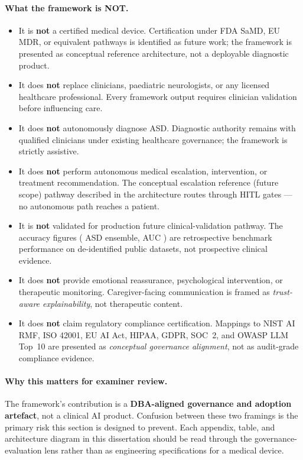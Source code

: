 \paragraph{What the framework is NOT.}
\begin{itemize}[leftmargin=*, itemsep=3pt]
    \item It is \textbf{not} a certified medical device. Certification under FDA SaMD, EU MDR, or equivalent pathways is identified as future work; the framework is presented as conceptual reference architecture, not a deployable diagnostic product.
    \item It does \textbf{not} replace clinicians, paediatric neurologists, or any licensed healthcare professional. Every framework output requires clinician validation before influencing care.
    \item It does \textbf{not} autonomously diagnose ASD. Diagnostic authority remains with qualified clinicians under existing healthcare governance; the framework is strictly assistive.
    \item It does \textbf{not} perform autonomous medical escalation, intervention, or treatment recommendation. The conceptual escalation reference (future scope) pathway described in the architecture routes through HITL gates --- no autonomous path reaches a patient.
    \item It is \textbf{not} validated for production future clinical-validation pathway. The accuracy figures (\asdacc{} ASD ensemble, AUC \aucval{}) are retrospective benchmark performance on de-identified public datasets, not prospective clinical evidence.
    \item It does \textbf{not} provide emotional reassurance, psychological intervention, or therapeutic monitoring. Caregiver-facing communication is framed as \emph{trust-aware explainability}, not therapeutic content.
    \item It does \textbf{not} claim regulatory compliance certification. Mappings to NIST AI RMF, ISO 42001, EU AI Act, HIPAA, GDPR, SOC~2, and OWASP LLM Top~10 are presented as \emph{conceptual governance alignment}, not as audit-grade compliance evidence.
\end{itemize}

\paragraph{Why this matters for examiner review.} The framework's contribution is a \textbf{DBA-aligned governance and adoption artefact}, not a clinical AI product. Confusion between these two framings is the primary risk this section is designed to prevent. Each appendix, table, and architecture diagram in this dissertation should be read through the governance-evaluation lens rather than as engineering specifications for a medical device.


